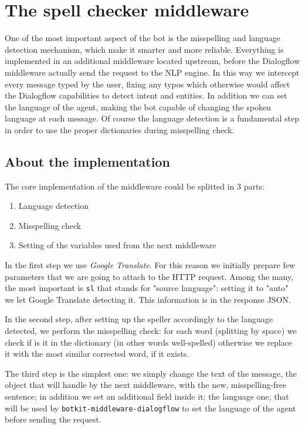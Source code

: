 \documentclass[a4paper,12pt]{report}
\begin{document}
	\section{The spell checker middleware}
	One of the most important aspect of the bot is the misspelling and language detection mechanism, which make it smarter and more reliable. Everything is implemented in an additional middleware located upstream, before the Dialogflow middleware actually send the request to the NLP engine. In this way we intercept every message typed by the user, fixing any typos which otherwise would affect the Dialogflow capabilities to detect intent and entities. In addition we can set the language of the agent, making the bot capable of changing the spoken language at each message. Of course the language detection is a fundamental step in order to use the proper dictionaries during misspelling check.
	
	\subsection{About the implementation}
	The core implementation of the middleware could be splitted in 3 parts:
	\begin{enumerate}
		\item Language detection
		\item Misspelling check
		\item Setting of the variables used from the next middleware
	\end{enumerate}
	In the first step we use \textit{Google Translate}. For this reason we initially prepare few parameters that we are going to attach to the HTTP request. Among the many, the most important is \texttt{sl} that stands for "source language": setting it to "auto" we let Google Translate detecting it. This information is in the response JSON.
	
	In the second step, after setting up the speller accordingly to the language detected, we perform the misspelling check: for each word (splitting by space) we check if is it in the dictionary (in other words well-spelled) otherwise we replace it with the most similar corrected word, if it exists.
	
	The third step is the simplest one: we simply change the text of the message, the object that will handle by the next middleware, with the new, misspelling-free sentence; in addition we set an additional field inside it: the language one, that will be used by \texttt{botkit-middleware-dialogflow} to set the language of the agent before sending the request.
	
\end{document}
